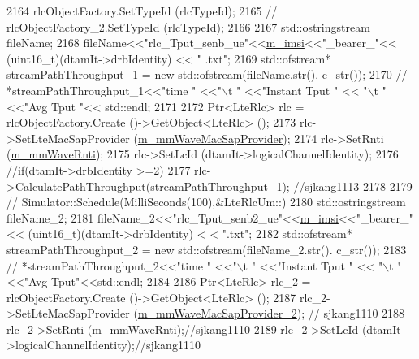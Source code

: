 \begin{DoxyCode}
2164               rlcObjectFactory.SetTypeId (rlcTypeId);
2165            \textcolor{comment}{//   rlcObjectFactory\_2.SetTypeId (rlcTypeId);}
2166 
2167               std::ostringstream fileName;
2168               fileName<<\textcolor{stringliteral}{"rlc\_Tput\_senb\_ue"}<<\hyperlink{classns3_1_1LteUeRrc_a1d825677309d17bdf729920f7dafd011}{m\_imsi}<<\textcolor{stringliteral}{"\_bearer\_"}<< (uint16\_t)(dtamIt->drbIdentity) << \textcolor{stringliteral}{"
      .txt"};
2169                                  std::ofstream* streamPathThroughput\_1 = \textcolor{keyword}{new} std::ofstream(fileName.str().
      c\_str());
2170             \textcolor{comment}{//  *streamPathThroughput\_1<<"time " <<"\(\backslash\)t " <<"Instant Tput " << "\(\backslash\)t " <<"Avg Tput "<<
       std::endl;}
2171 
2172               Ptr<LteRlc> rlc = rlcObjectFactory.Create ()->GetObject<LteRlc> ();
2173               rlc->SetLteMacSapProvider (\hyperlink{classns3_1_1LteUeRrc_ace6035d94d2a6fb838f107450d49b373}{m\_mmWaveMacSapProvider}); 
2174               rlc->SetRnti (\hyperlink{classns3_1_1LteUeRrc_a0bd0d5c3b49624be1fd217f96910f56a}{m\_mmWaveRnti});
2175               rlc->SetLcId (dtamIt->logicalChannelIdentity);
2176               \textcolor{comment}{//if(dtamIt->drbIdentity >=2)}
2177               rlc->CalculatePathThroughput(streamPathThroughput\_1); \textcolor{comment}{//sjkang1113}
2178 
2179               \textcolor{comment}{//  Simulator::Schedule(MilliSeconds(100),&LteRlcUm::)}
2180               std::ostringstream fileName\_2;
2181               fileName\_2<<\textcolor{stringliteral}{"rlc\_Tput\_senb2\_ue"}<<\hyperlink{classns3_1_1LteUeRrc_a1d825677309d17bdf729920f7dafd011}{m\_imsi}<<\textcolor{stringliteral}{"\_bearer\_"}<< (uint16\_t)(dtamIt->drbIdentity) <
      < \textcolor{stringliteral}{".txt"};
2182                                std::ofstream* streamPathThroughput\_2 = \textcolor{keyword}{new} std::ofstream(fileName\_2.str().
      c\_str());
2183              \textcolor{comment}{// *streamPathThroughput\_2<<"time " <<"\(\backslash\)t " <<"Instant Tput " << "\(\backslash\)t " <<"Avg
       Tput"<<std::endl;}
2184 
2186               Ptr<LteRlc> rlc\_2 = rlcObjectFactory.Create ()->GetObject<LteRlc> ();
2187                 rlc\_2->SetLteMacSapProvider (\hyperlink{classns3_1_1LteUeRrc_a0df418b8b1c9be4267f5b56d904ba841}{m\_mmWaveMacSapProvider\_2}); \textcolor{comment}{//
      sjkang1110}
2188                 rlc\_2->SetRnti (\hyperlink{classns3_1_1LteUeRrc_a0bd0d5c3b49624be1fd217f96910f56a}{m\_mmWaveRnti});\textcolor{comment}{//sjkang1110}
2189                 rlc\_2->SetLcId (dtamIt->logicalChannelIdentity);\textcolor{comment}{//sjkang1110}

\end{DoxyCode}
